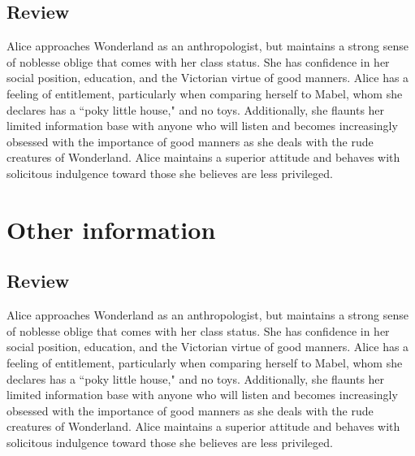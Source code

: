 \documentclass[letterpaper]{tenseconds} %
\begin{document}
\subsection{Review}

Alice approaches Wonderland as an anthropologist, but maintains a strong sense of noblesse oblige that comes with her class status. She has confidence in her social position, education, and the Victorian virtue of good manners. Alice has a feeling of entitlement, particularly when comparing herself to Mabel, whom she declares has a ``poky little house," and no toys. Additionally, she flaunts her limited information base with anyone who will listen and becomes increasingly obsessed with the importance of good manners as she deals with the rude creatures of Wonderland. Alice maintains a superior attitude and behaves with solicitous indulgence toward those she believes are less privileged.

\section{Other information}

\subsection{Review}

Alice approaches Wonderland as an anthropologist, but maintains a strong sense of noblesse oblige that comes with her class status. She has confidence in her social position, education, and the Victorian virtue of good manners. Alice has a feeling of entitlement, particularly when comparing herself to Mabel, whom she declares has a ``poky little house," and no toys. Additionally, she flaunts her limited information base with anyone who will listen and becomes increasingly obsessed with the importance of good manners as she deals with the rude creatures of Wonderland. Alice maintains a superior attitude and behaves with solicitous indulgence toward those she believes are less privileged.
\end{document}

